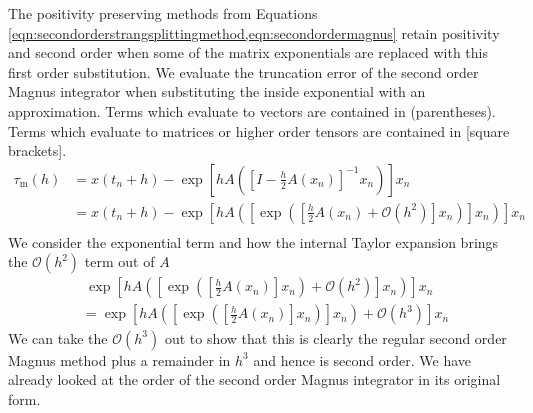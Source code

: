 The positivity preserving methods from Equations \ref{eqn:secondorderstrangsplittingmethod,eqn:secondordermagnus} retain positivity and second order when some of the matrix exponentials are replaced with this first order substitution.
We evaluate the truncation error of the second order Magnus integrator when substituting the inside exponential with an approximation.
Terms which evaluate to vectors are contained in (parentheses). Terms which evaluate to matrices or higher order tensors are contained in [square brackets].
\begin{equation*}
    \begin{aligned}
        \tau_\mathrm{m}(h) &= x(t_n + h) - \exp \left[
            h A \left(
                \left[
                    I - \frac{h}{2}A(x_n)
                \right]^{-1} x_n
            \right)
        \right]x_n \\
        &= x(t_n + h) - \exp \left[
            h A \left(
                \left[
                    \exp \left(
                        \left[
                            \frac{h}{2}A(x_n) + \mathcal{O}(h^2)
                        \right] x_n
                    \right)
                \right] x_n
            \right)
        \right]x_n \\
    \end{aligned}
\end{equation*}
We consider the exponential term and how the internal Taylor expansion brings the $\mathcal{O}(h^2)$ term out of $A$
\begin{equation*}
    \begin{aligned}
        &~ \exp \left[
            h A \left(
                \left[
                    \exp \left(
                        \left[
                            \frac{h}{2}A(x_n)
                        \right] x_n
                    \right) + \mathcal{O}(h^2)
                \right] x_n
            \right)
        \right]x_n \\
        &= \exp \left[
            h A \left(
                \left[
                    \exp \left(
                        \left[
                            \frac{h}{2}A(x_n)
                        \right] x_n
                    \right)
                \right] x_n
            \right) + \mathcal{O}(h^3)
        \right]x_n
    \end{aligned}
\end{equation*}
We can take the $\mathcal{O}(h^3)$ out to show that this is clearly the regular second order Magnus method plus a remainder in $h^3$ and hence is second order.
We have already looked at the order of the second order Magnus integrator in its original form. 

